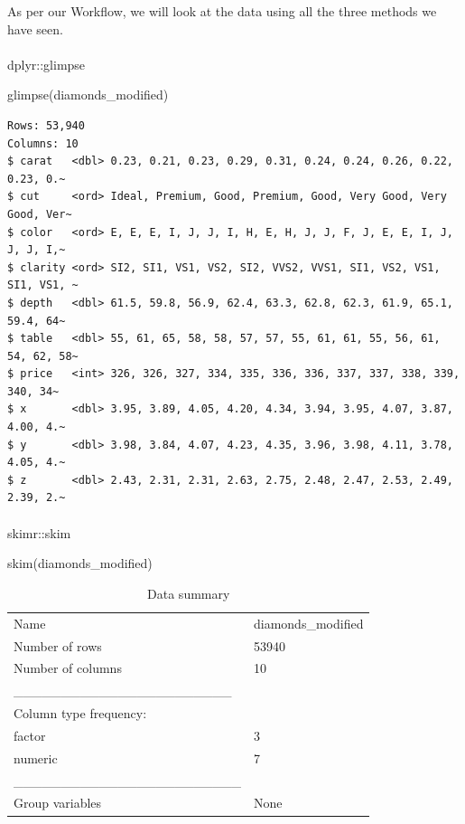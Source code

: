 \documentclass[
  letterpaper,
  DIV=11,
  numbers=noendperiod,
  oneside]{scrartcl}
\makeatletter
\let\oldparagraph\paragraph
\renewcommand{\paragraph}{
    \@ifstar
      \xxxParagraphStar
      \xxxParagraphNoStar
  }
\newcommand{\xxxParagraphStar}[1]{\oldparagraph*{#1}\mbox{}}
\newcommand{\xxxParagraphNoStar}[1]{\oldparagraph{#1}\mbox{}}
\newenvironment{Shaded}{\begin{snugshade}}{\end{snugshade}}
\newcommand{\FunctionTok}[1]{\textcolor[rgb]{0.28,0.35,0.67}{#1}}
\newcommand{\NormalTok}[1]{\textcolor[rgb]{0.00,0.23,0.31}{#1}}
\makeatother
\begin{document}
As per our Workflow, we will look at the data using all the three
methods we have seen.

\paragraph{\texorpdfstring{ dplyr::glimpse}{ dplyr::glimpse}}

\begin{Shaded}
\begin{Highlighting}[]
\FunctionTok{glimpse}\NormalTok{(diamonds\_modified)}
\end{Highlighting}
\end{Shaded}

\begin{verbatim}
Rows: 53,940
Columns: 10
$ carat   <dbl> 0.23, 0.21, 0.23, 0.29, 0.31, 0.24, 0.24, 0.26, 0.22, 0.23, 0.~
$ cut     <ord> Ideal, Premium, Good, Premium, Good, Very Good, Very Good, Ver~
$ color   <ord> E, E, E, I, J, J, I, H, E, H, J, J, F, J, E, E, I, J, J, J, I,~
$ clarity <ord> SI2, SI1, VS1, VS2, SI2, VVS2, VVS1, SI1, VS2, VS1, SI1, VS1, ~
$ depth   <dbl> 61.5, 59.8, 56.9, 62.4, 63.3, 62.8, 62.3, 61.9, 65.1, 59.4, 64~
$ table   <dbl> 55, 61, 65, 58, 58, 57, 57, 55, 61, 61, 55, 56, 61, 54, 62, 58~
$ price   <int> 326, 326, 327, 334, 335, 336, 336, 337, 337, 338, 339, 340, 34~
$ x       <dbl> 3.95, 3.89, 4.05, 4.20, 4.34, 3.94, 3.95, 4.07, 3.87, 4.00, 4.~
$ y       <dbl> 3.98, 3.84, 4.07, 4.23, 4.35, 3.96, 3.98, 4.11, 3.78, 4.05, 4.~
$ z       <dbl> 2.43, 2.31, 2.31, 2.63, 2.75, 2.48, 2.47, 2.53, 2.49, 2.39, 2.~
\end{verbatim}

\paragraph{\texorpdfstring{ skimr::skim}{ skimr::skim}}

\begin{Shaded}
\begin{Highlighting}[]
\FunctionTok{skim}\NormalTok{(diamonds\_modified)}
\end{Highlighting}
\end{Shaded}

\begin{longtable}[]{@{}ll@{}}
\caption{Data summary}\tabularnewline
\toprule\noalign{}
\endfirsthead
\endhead
\bottomrule\noalign{}
\endlastfoot
Name & diamonds\_modified \\
Number of rows & 53940 \\
Number of columns & 10 \\
\_\_\_\_\_\_\_\_\_\_\_\_\_\_\_\_\_\_\_\_\_\_\_ & \\
Column type frequency: & \\
factor & 3 \\
numeric & 7 \\
\_\_\_\_\_\_\_\_\_\_\_\_\_\_\_\_\_\_\_\_\_\_\_\_ & \\
Group variables & None \\
\end{longtable}
\end{document}
